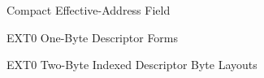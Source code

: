 \begin{manuallistedbitdiagram}{Compact Effective-Address Field}
\end{manuallistedbitdiagram}

\begin{manuallistedbitdiagram}{EXT0 One-Byte Descriptor Forms}
\end{manuallistedbitdiagram}

\begin{manuallistedbitdiagram}{EXT0 Two-Byte Indexed Descriptor Byte Layouts}
\end{manuallistedbitdiagram}

